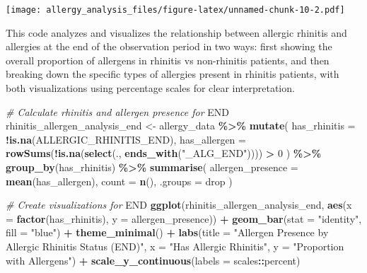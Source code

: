\documentclass[
]{article}
\newenvironment{Shaded}{\begin{snugshade}}{\end{snugshade}}
\newcommand{\AttributeTok}[1]{\textcolor[rgb]{0.13,0.29,0.53}{#1}}
\newcommand{\CommentTok}[1]{\textcolor[rgb]{0.56,0.35,0.01}{\textit{#1}}}
\newcommand{\DecValTok}[1]{\textcolor[rgb]{0.00,0.00,0.81}{#1}}
\newcommand{\FunctionTok}[1]{\textcolor[rgb]{0.13,0.29,0.53}{\textbf{#1}}}
\newcommand{\NormalTok}[1]{#1}
\newcommand{\OtherTok}[1]{\textcolor[rgb]{0.56,0.35,0.01}{#1}}
\newcommand{\RegionMarkerTok}[1]{#1}
\newcommand{\SpecialCharTok}[1]{\textcolor[rgb]{0.81,0.36,0.00}{\textbf{#1}}}
\newcommand{\StringTok}[1]{\textcolor[rgb]{0.31,0.60,0.02}{#1}}
\begin{document}
\texttt{[image: allergy\_analysis\_files/figure-latex/unnamed-chunk-10-2.pdf]}

This code analyzes and visualizes the relationship between allergic
rhinitis and allergies at the end of the observation period in two ways:
first showing the overall proportion of allergens in rhinitis vs
non-rhinitis patients, and then breaking down the specific types of
allergies present in rhinitis patients, with both visualizations using
percentage scales for clear interpretation.

\begin{Shaded}
\begin{Highlighting}[]
\CommentTok{\# Calculate rhinitis and allergen presence for }\RegionMarkerTok{END}
\NormalTok{rhinitis\_allergen\_analysis\_end }\OtherTok{\textless{}{-}}\NormalTok{ allergy\_data }\SpecialCharTok{\%\textgreater{}\%}
  \FunctionTok{mutate}\NormalTok{(}
    \AttributeTok{has\_rhinitis =} \SpecialCharTok{!}\FunctionTok{is.na}\NormalTok{(ALLERGIC\_RHINITIS\_END),}
    \AttributeTok{has\_allergen =} \FunctionTok{rowSums}\NormalTok{(}\SpecialCharTok{!}\FunctionTok{is.na}\NormalTok{(}\FunctionTok{select}\NormalTok{(., }\FunctionTok{ends\_with}\NormalTok{(}\StringTok{"\_ALG\_END"}\NormalTok{)))) }\SpecialCharTok{\textgreater{}} \DecValTok{0}
\NormalTok{  ) }\SpecialCharTok{\%\textgreater{}\%}
  \FunctionTok{group\_by}\NormalTok{(has\_rhinitis) }\SpecialCharTok{\%\textgreater{}\%}
  \FunctionTok{summarise}\NormalTok{(}
    \AttributeTok{allergen\_presence =} \FunctionTok{mean}\NormalTok{(has\_allergen),}
    \AttributeTok{count =} \FunctionTok{n}\NormalTok{(),}
    \AttributeTok{.groups =} \StringTok{\textquotesingle{}drop\textquotesingle{}}
\NormalTok{  )}

\CommentTok{\# Create visualizations for }\RegionMarkerTok{END}
\FunctionTok{ggplot}\NormalTok{(rhinitis\_allergen\_analysis\_end, }
       \FunctionTok{aes}\NormalTok{(}\AttributeTok{x =} \FunctionTok{factor}\NormalTok{(has\_rhinitis), }\AttributeTok{y =}\NormalTok{ allergen\_presence)) }\SpecialCharTok{+}
  \FunctionTok{geom\_bar}\NormalTok{(}\AttributeTok{stat =} \StringTok{"identity"}\NormalTok{, }\AttributeTok{fill =} \StringTok{"blue"}\NormalTok{) }\SpecialCharTok{+}
  \FunctionTok{theme\_minimal}\NormalTok{() }\SpecialCharTok{+}
  \FunctionTok{labs}\NormalTok{(}\AttributeTok{title =} \StringTok{"Allergen Presence by Allergic Rhinitis Status (END)"}\NormalTok{,}
       \AttributeTok{x =} \StringTok{"Has Allergic Rhinitis"}\NormalTok{,}
       \AttributeTok{y =} \StringTok{"Proportion with Allergens"}\NormalTok{) }\SpecialCharTok{+}
  \FunctionTok{scale\_y\_continuous}\NormalTok{(}\AttributeTok{labels =}\NormalTok{ scales}\SpecialCharTok{::}\NormalTok{percent)}
\end{Highlighting}
\end{Shaded}
\end{document}
